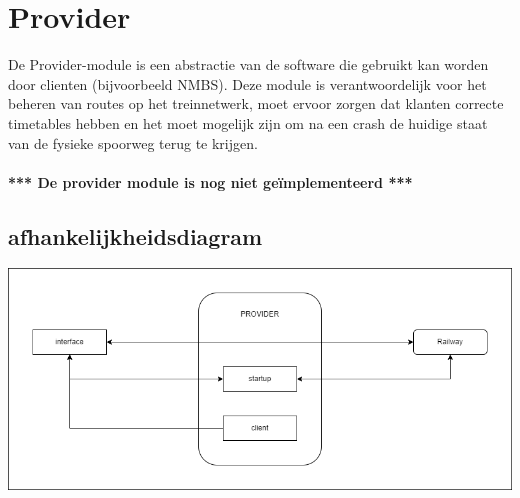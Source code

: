 \documentclass[a4paper, 11pt]{article}
\newcommand{\<}{\scriptsize\textless\normalsize}
\renewcommand{\>}{\scriptsize\textgreater\normalsize}
\begin{document}
\newpage
\section{Provider} %
De Provider-module is een abstractie van de software die gebruikt kan worden door clienten (bijvoorbeeld NMBS). Deze module is verantwoordelijk voor het beheren van routes op het treinnetwerk, moet ervoor zorgen dat klanten correcte timetables hebben en het moet mogelijk zijn om na een crash de huidige staat van de fysieke spoorweg terug te krijgen.\\\\

\noindent \textbf{*** De provider module is nog niet ge\"implementeerd ***}\\

\subsection{afhankelijkheidsdiagram} %
\begin{center}
	\includegraphics[scale=.5]{Afhankelijkheidsdiagrammen/provider.png}
\end{center}
\end{document}
